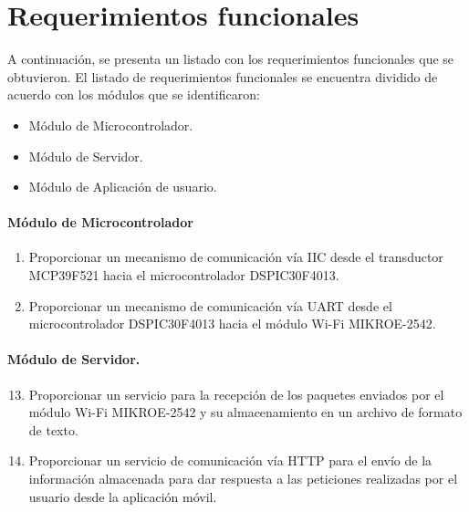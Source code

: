 \section{Requerimientos funcionales}
A continuación, se presenta un listado con los requerimientos funcionales que se obtuvieron.
El listado de requerimientos funcionales se encuentra dividido de acuerdo con los módulos que se identificaron:
\begin{itemize}
	\item Módulo de Microcontrolador.
	\item Módulo de Servidor.
	\item Módulo de Aplicación de usuario.
\end{itemize}

\paragraph{Módulo de Microcontrolador}
\begin{enumerate}[label=RF\arabic*.]
	\item Proporcionar un mecanismo de comunicación vía IIC desde el transductor MCP39F521 hacia el microcontrolador DSPIC30F4013.
	\item Proporcionar un mecanismo de comunicación vía UART desde el microcontrolador DSPIC30F4013 hacia el módulo Wi-Fi MIKROE-2542.
\end{enumerate}

\paragraph{Módulo de Servidor.}
\begin{enumerate}[label=RF\arabic*.]
	\setcounter{enumi}{12}
	\item Proporcionar un servicio para la recepción de los paquetes enviados por el módulo Wi-Fi MIKROE-2542 y su almacenamiento en un archivo de formato de texto.
	\item Proporcionar un servicio de comunicación vía HTTP para el envío de la información almacenada para dar respuesta a las peticiones realizadas por el usuario desde la aplicación móvil.  
\end{enumerate}

